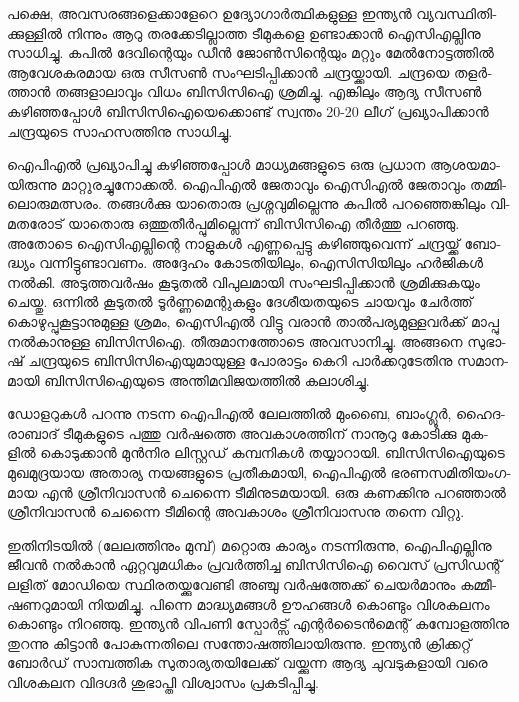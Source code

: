 ­പ­ക്ഷെ, അവ­സ­ര­ങ്ങ­ളെ­ക്കാ­ളേ­റെ ഉദ്യോ­ഗാര്‍­ത്ഥി­ക­ളു­ള്ള ഇന്ത്യന്‍ വ്യ­വ­സ്ഥി­തി­ക്കു­ള്ളില്‍ നി­ന്നും ആറു തര­ക്കേ­ടി­ല്ലാ­ത്ത 
­ടീ­മു­ക­ളെ ഉണ്ടാ­ക്കാന്‍ ഐസി­എ­ല്ലി­നു സാ­ധി­ച്ചു. കപില്‍ ദേ­വി­ന്റെ­യും ഡീന്‍ ജോണ്‍­സി­ന്റെ­യും മറ്റും മേല്‍­നോ­ട്ട­ത്തില്‍ 
ആവേ­ശ­ക­ര­മായ ഒരു സീ­സണ്‍ സം­ഘ­ടി­പ്പി­ക്കാന്‍ ചന്ദ്ര­യ്ക്കാ­യി. ചന്ദ്ര­യെ തളര്‍­ത്താന്‍ തങ്ങ­ളാ­ലാ­വും വി­ധം ബി­സി­സിഐ 
ശ്ര­മി­ച്ചു. എങ്കി­ലും ആദ്യ സീ­സണ്‍ കഴി­ഞ്ഞ­പ്പോള്‍ ബി­സി­സി­ഐ­യെ­ക്കൊ­ണ്ട് സ്വ­ന്തം 20-20 ലീ­ഗ് പ്ര­ഖ്യാ­പി­ക്കാന്‍ ചന്ദ്ര­യു­ടെ 
സാ­ഹ­സ­ത്തി­നു സാ­ധി­ച്ചു­.



ഐപിഎല്‍ പ്ര­ഖ്യാ­പി­ച്ചു കഴി­ഞ്ഞ­പ്പോള്‍ മാ­ധ്യ­മ­ങ്ങ­ളു­ടെ ഒരു പ്ര­ധാന ആശ­യ­മാ­യി­രു­ന്നു മാ­റ്റു­ര­ച്ചു­നോ­ക്കല്‍. ഐപി­എല്‍ 
ജേ­താ­വും ഐ­സി­എല്‍ ജേ­താ­വും തമ്മി­ലൊ­രു­മ­ത്സ­രം. തങ്ങള്‍­ക്കു യാ­തൊ­രു പ്ര­ശ്ന­വു­മി­ല്ലെ­ന്നു കപില്‍ പറ­ഞ്ഞെ­ങ്കി­ലും 
വി­മ­ത­രോ­ട് യാ­തൊ­രു ഒത്തു­തീര്‍­പ്പു­മി­ല്ലെ­ന്ന് ബി­സി­സിഐ തീര്‍­ത്തു പറ­ഞ്ഞു. അതോ­ടെ ഐസി­എ­ല്ലി­ന്റെ നാ­ളു­കള്‍ 
എണ്ണ­പ്പെ­ട്ടു കഴി­ഞ്ഞു­വെ­ന്ന് ചന്ദ്ര­യ്ക്ക് ബോ­ദ്ധ്യം വന്നി­ട്ടു­ണ്ടാ­വ­ണം. അദ്ദേ­ഹം കോ­ട­തി­യി­ലും, ഐസി­സി­യി­ലും ഹര്‍­ജി­കള്‍ 
നല്‍­കി. അടു­ത്ത­വര്‍­ഷം കൂ­ടു­തല്‍ വി­പു­ല­മാ­യി സം­ഘ­ടി­പ്പി­ക്കാന്‍ ശ്ര­മി­ക്കു­ക­യും ചെ­യ്തു. ഒന്നില്‍ കൂ­ടു­തല്‍ ടൂര്‍­ണ്ണ­മെ­ന്റു­ക­ളും 
ദേ­ശീ­യ­ത­യു­ടെ ചാ­യ­വും ചേര്‍­ത്ത് കൊ­ഴു­പ്പു­കൂ­ട്ടാ­നു­മു­ള്ള ശ്ര­മം, ഐസി­എല്‍ വി­ട്ടു വരാന്‍ താല്‍­പ­ര്യ­മു­ള്ള­വര്‍­ക്ക് മാ­പ്പു 
നല്‍­കാ­നു­ള്ള ബി­സി­സി­ഐ. തീ­രു­മാ­ന­ത്തോ­ടെ അവ­സാ­നി­ച്ചു. അങ്ങ­നെ സു­ഭാ­ഷ് ചന്ദ്ര­യു­ടെ ബി­സി­സി­ഐ­യു­മാ­യു­ള്ള 
പോ­രാ­ട്ടം കെ­റി പാര്‍­ക്ക­റു­ടേ­തി­നു സമാ­ന­മാ­യി ബി­സി­സി­ഐ­യു­ടെ അന്തി­മ­വി­ജ­യ­ത്തില്‍ കലാ­ശി­ച്ചു.

­ഡോ­ള­റു­കള്‍ പറ­ന്നു നട­ന്ന ഐപി­എല്‍ ലേ­ല­ത്തില്‍ മും­ബൈ, ബാം­ഗ്ലൂര്‍, ഹൈ­ദ­രാ­ബാ­ദ് ടീ­മു­ക­ളു­ടെ പത്തു വര്‍­ഷ­ത്തെ 
അവ­കാ­ശ­ത്തി­ന് നാ­നൂ­റു കോ­ടി­ക്കു മു­ക­ളില്‍ കൊ­ടു­ക്കാന്‍ മുന്‍­നിര ലി­സ്റ്റ­ഡ് കമ്പ­നി­കള്‍ തയ്യാ­റാ­യി. ബി­സി­സി­ഐ­യു­ടെ 
മു­ഖ­മു­ദ്ര­യായ അതാ­ര്യ നയ­ങ്ങ­ളു­ടെ പ്ര­തീ­ക­മാ­യി, ഐപി­എല്‍ ഭര­ണ­സ­മി­തി­യം­ഗ­മായ എന്‍ ശ്രീ­നി­വാ­സന്‍ ചെ­ന്നൈ 
ടീ­മി­നു­ട­മ­യാ­യി. ഒരു കണ­ക്കി­നു പറ­ഞ്ഞാല്‍ ശ്രീ­നി­വാ­സന്‍ ചെ­ന്നൈ ടീ­മി­ന്റെ അവ­കാ­ശം ശ്രീ­നി­വാ­സ­നു തന്നെ വി­റ്റു.

ഇ­തി­നി­ട­യില്‍ (ലേ­ല­ത്തി­നും മു­മ്പ്) മറ്റൊ­രു കാ­ര്യം നട­ന്നി­രു­ന്നു, ഐപി­എ­ല്ലി­നു ജീ­വന്‍ നല്‍­കാന്‍ ഏറ്റ­വു­മ­ധി­കം പ്ര­വര്‍­ത്തി­ച്ച 
ബി­സി­സിഐ വൈ­സ് പ്ര­സി­ഡ­ന്റ് ലളി­ത് മോ­ഡി­യെ സ്ഥി­ര­ത­യ്ക്കു­വേ­ണ്ടി അഞ്ചു വര്‍­ഷ­ത്തേ­ക്ക് ചെ­യര്‍­മാ­നും കമ്മീ­ഷ­ണ­റു­മാ­യി 
നി­യ­മി­ച്ചു. പി­ന്നെ മാ­ദ്ധ്യ­മ­ങ്ങള്‍ ഊഹ­ങ്ങള്‍ കൊ­ണ്ടും വി­ശ­ക­ല­നം കൊ­ണ്ടും നി­റ­ഞ്ഞു. ഇന്ത്യന്‍ വി­പ­ണി സ്പോര്‍­ട്സ് 
എന്റര്‍­ടൈന്‍­മെ­ന്റ് കമ്പോ­ള­ത്തി­നു തു­റ­ന്നു കി­ട്ടാന്‍ പോ­കു­ന്ന­തി­ലെ സന്തോ­ഷ­ത്തി­ലാ­യി­രു­ന്നു. ഇന്ത്യന്‍ ക്രി­ക്ക­റ്റ് ബോര്‍­ഡ് 
സാ­മ്പ­ത്തിക സു­താ­ര്യ­ത­യി­ലേ­ക്ക് വയ്ക്കു­ന്ന ആദ്യ ചു­വ­ടു­ക­ളാ­യി വരെ വി­ശ­ക­ലന വി­ദ­ഗ്ദര്‍ ശു­ഭാ­പ്തി വി­ശ്വാ­സം പ്ര­ക­ടി­പ്പി­ച്ചു.

